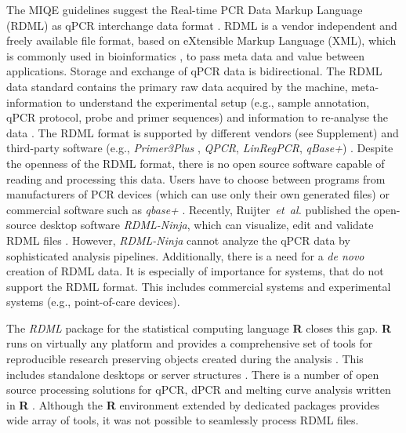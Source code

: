 \documentclass{bioinfo}
\begin{document}
The MIQE guidelines suggest the Real-time PCR Data Markup Language (RDML) as 
qPCR interchange data format \cite{rdml-ninja_2015}. RDML is a vendor 
independent and freely available file format, based on eXtensible Markup 
Language (XML), which is commonly used in bioinformatics \cite{achard_xml_2001}, 
to pass meta data and value between applications. Storage and exchange of qPCR 
data is bidirectional. The RDML data standard contains the primary raw data 
acquired by the machine, meta-information to understand the experimental setup 
(e.g., sample annotation, qPCR protocol, probe and primer sequences) and 
information to re-analyse the data \cite{lefever_rdml_2009}. The RDML format is 
supported by different vendors (see Supplement) and third-party software (e.g., 
\textit{Primer3Plus} \cite{untergasser_2007}, \textit{QPCR}, \textit{LinRegPCR}, 
\textit{qBase+}) \cite{pabinger_2014, rdml-ninja_2015}. Despite the openness of 
the RDML format, there is no open source software capable of reading and 
processing this data. Users have to choose between programs from manufacturers 
of PCR devices (which can use only their own generated files) or commercial 
software such as \textit{qbase+} \cite{pabinger_2014, rdml-ninja_2015}. 
Recently, Ruijter~\textit{et~al.} published the open-source desktop software 
\textit{RDML-Ninja}, which can visualize, edit and validate RDML files 
\cite{rdml-ninja_2015}. However, \textit{RDML-Ninja} cannot analyze the qPCR 
data by sophisticated analysis pipelines. Additionally, there is a need for a 
\textit{de novo} creation of RDML data.  It is especially of importance for 
systems, that do not support the RDML format. 
This includes commercial systems and experimental systems (e.g.,  point-of-care 
devices). 

The \textit{RDML} package for the statistical computing language \textbf{R} 
closes this gap. \textbf{R} runs on virtually any platform and provides a 
comprehensive set of tools for reproducible research preserving objects created 
during the analysis \cite{roediger2015r,roediger2015chippcr}. This includes 
standalone desktops or server structures \cite{roediger2015r}. There is a number 
of open source processing solutions for qPCR, dPCR and melting curve analysis 
written in \textbf{R} \cite{pabinger_2014, ritz_qpcr_2008, roediger_RJ_2013, 
roediger2015chippcr}. Although the \textbf{R} environment extended by dedicated 
packages provides wide array of tools, it was not possible to seamlessly process 
RDML files.
\end{document}
